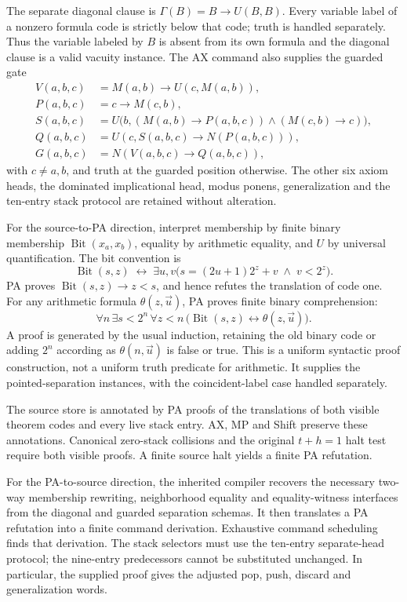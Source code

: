 \documentclass[11pt,letterpaper]{article}
\begin{document}
The separate diagonal clause is
$\Gamma(B)=B\to U(B,B)$. Every variable label of a nonzero
formula code is strictly below that code; truth is handled
separately. Thus the variable labeled by $B$ is absent from its
own formula and the diagonal clause is a valid vacuity instance.
The AX command also supplies the guarded gate
\[
\begin{aligned}
 V(a,b,c)&=M(a,b)\to U(c,M(a,b)),\\
 P(a,b,c)&=c\to M(c,b),\\
 S(a,b,c)&=U\bigl(b,(M(a,b)\to P(a,b,c))
                       \wedge(M(c,b)\to c)\bigr),\\
 Q(a,b,c)&=U(c,S(a,b,c)\to N(P(a,b,c))),\\
 G(a,b,c)&=N(V(a,b,c)\to Q(a,b,c)),
\end{aligned}
\]
with $c\ne a,b$, and truth at the guarded position otherwise.
The other six axiom heads, the dominated implicational head,
modus ponens, generalization and the ten-entry stack protocol
are retained without alteration.

For the source-to-PA direction, interpret membership by finite
binary membership $\operatorname{Bit}(x_a,x_b)$, equality by
arithmetic equality, and $U$ by universal quantification. The bit
convention is
\[
 \operatorname{Bit}(s,z)\;\longleftrightarrow\;
 \exists u,v\bigl(s=(2u+1)2^z+v\;\wedge\;v<2^z\bigr).
\]
PA proves $\operatorname{Bit}(s,z)\to z<s$, and hence refutes
the translation of code one. For any arithmetic formula
$\theta(z,\vec u)$, PA proves finite binary comprehension:
\[
 \forall n\,\exists s<2^n\,\forall z<n\,
   \bigl(\operatorname{Bit}(s,z)\leftrightarrow\theta(z,\vec u)\bigr).
\]
A proof is generated by the usual induction, retaining the old
binary code or adding $2^n$ according as $\theta(n,\vec u)$
is false or true. This is a uniform syntactic proof construction,
not a uniform truth predicate for arithmetic. It supplies the
pointed-separation instances, with the coincident-label case
handled separately.

The source store is annotated by PA proofs of the translations
of both visible theorem codes and every live stack entry. AX,
MP and Shift preserve these annotations. Canonical zero-stack
collisions and the original $t+h=1$ halt test require both visible
proofs. A finite source halt yields a finite PA refutation.

For the PA-to-source direction, the inherited compiler recovers
the necessary two-way membership rewriting, neighborhood equality
and equality-witness interfaces from the diagonal and guarded
separation schemas. It then translates a PA refutation into a
finite command derivation. Exhaustive command scheduling finds
that derivation. The stack selectors must use the ten-entry
separate-head protocol; the nine-entry predecessors cannot be
substituted unchanged. In particular, the supplied proof gives
the adjusted pop, push, discard and generalization words.
\end{document}
